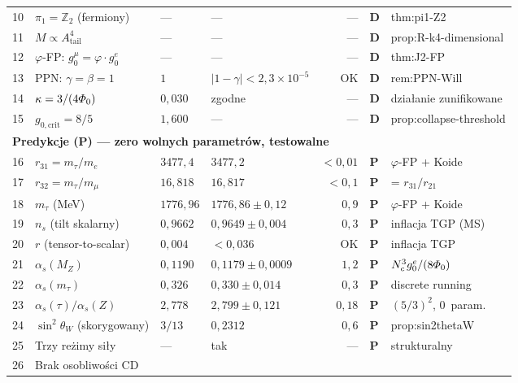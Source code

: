 \begin{center}
\begin{longtable}{@{}rp{3.8cm}llrll@{}}
10 & $\pi_1 = \mathbb{Z}_2$ (fermiony)
   & --- & --- & --- & \textbf{D} & thm:pi1-Z2 \\
11 & $M \propto A_{\mathrm{tail}}^4$
   & --- & --- & --- & \textbf{D} & prop:R-k4-dimensional \\
12 & $\varphi$-FP: $g_0^\mu = \varphi \cdot g_0^e$
   & --- & --- & --- & \textbf{D} & thm:J2-FP \\
13 & PPN: $\gamma = \beta = 1$
   & $1$ & $|1-\gamma| < 2{,}3 \times 10^{-5}$ & OK & \textbf{D} & rem:PPN-Will \\
14 & $\kappa = 3/(4\varPhi_0)$
   & $0{,}030$ & zgodne & --- & \textbf{D} & dzia\l{}anie zunifikowane \\
15 & $g_{0,\mathrm{crit}} = 8/5$
   & $1{,}600$ & --- & --- & \textbf{D} & prop:collapse-threshold \\
%
\midrule
%
%
\multicolumn{7}{l}{\textbf{Predykcje (P) --- zero wolnych parametr\'ow, testowalne}} \\
\midrule
%
16 & $r_{31} = m_\tau / m_e$
   & $3477{,}4$ & $3477{,}2$ & $< 0{,}01$ & \textbf{P} & $\varphi$-FP + Koide \\
17 & $r_{32} = m_\tau / m_\mu$
   & $16{,}818$ & $16{,}817$ & $< 0{,}1$ & \textbf{P} & = $r_{31}/r_{21}$ \\
18 & $m_\tau$ (MeV)
   & $1776{,}96$ & $1776{,}86 \pm 0{,}12$ & $0{,}9$ & \textbf{P} & $\varphi$-FP + Koide \\
%
19 & $n_s$ (tilt skalarny)
   & $0{,}9662$ & $0{,}9649 \pm 0{,}004$ & $0{,}3$ & \textbf{P} & inflacja TGP (MS) \\
20 & $r$ (tensor-to-scalar)
   & $0{,}004$ & $< 0{,}036$ & OK & \textbf{P} & inflacja TGP \\
%
21 & $\alpha_s(M_Z)$
   & $0{,}1190$ & $0{,}1179 \pm 0{,}0009$ & $1{,}2$ & \textbf{P} & $N_c^3 g_0^e/(8\varPhi_0)$ \\
22 & $\alpha_s(m_\tau)$
   & $0{,}326$ & $0{,}330 \pm 0{,}014$ & $0{,}3$ & \textbf{P} & discrete running \\
23 & $\alpha_s(\tau)/\alpha_s(Z)$
   & $2{,}778$ & $2{,}799 \pm 0{,}121$ & $0{,}18$ & \textbf{P} & $(5/3)^2$, 0~param. \\
24 & $\sin^2\theta_W$ (skorygowany)
   & $3/13$ & $0{,}2312$ & $0{,}6$ & \textbf{P} & prop:sin2thetaW \\
%
25 & Trzy re\.zimy si\l{}y
   & --- & tak & --- & \textbf{P} & strukturalny \\
26 & Brak osobliwo\'sci CD

\end{longtable}
\end{center}
